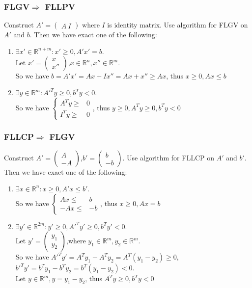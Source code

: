 	\subsubsection*{FLGV$\Rightarrow$ FLLPV}
	Construct \boldmath $A'=
	\begin{pmatrix}
	A\ I
	\end{pmatrix}$ where $I$ is identity matrix. Use algorithm for FLGV on $A'$ and $b$. Then we have exact one of the following:
	\begin{enumerate}
		\item $\exists x'\in \mathbb{R}^{n+m}:x'\geq 0,A'x'=b$.\\ Let $x'=\begin{pmatrix}
		x\\x''
		\end{pmatrix}$,$x\in \mathbb{R}^n,x''\in \mathbb{R}^m$.\\ So we have $b=A'x'=Ax+Ix''=Ax+x''\geq Ax$, thus $x\geq 0,Ax\leq b$
		\item $\exists y\in \mathbb{R}^{m}:A'^Ty\geq 0,b^Ty<0$.\\ So we have $\left\{\begin{aligned}
		A^Ty\geq& 0\\
		I^Ty\geq& 0
		\end{aligned}\right.$, thus $y\geq0,A^Ty\geq 0,b^Ty<0$
	\end{enumerate}
	\subsubsection*{FLLCP$\Rightarrow$ FLGV}
	Construct \boldmath $A'=
	\begin{pmatrix}
	A\\ -A
	\end{pmatrix}$,$b'=\begin{pmatrix}
	b\\ -b
	\end{pmatrix}$. Use algorithm for FLLCP on $A'$ and $b'$. Then we have exact one of the following:
	\begin{enumerate}
		\item $\exists x\in \mathbb{R}^n:x\geq 0,A'x\leq b'$.\\ So we have $\left\{\begin{aligned}
		Ax\leq& b\\
		-Ax\leq& -b
		\end{aligned}\right.$, thus $x\geq 0,Ax=b$
		\item $\exists y'\in \mathbb{R}^{2m}:y'\geq 0,A'^Ty'\geq 0,b^Ty'<0$.\\ Let $y'=\begin{pmatrix}
		y_1\\ y_2
		\end{pmatrix}$,where $y_1\in \mathbb{R}^m,y_2\in \mathbb{R}^m$.\\ So we have $A'^Ty'=A^Ty_1-A^Ty_2=A^T(y_1-y_2)\geq 0$, $b'^Ty'=b^Ty_1-b^Ty_2=b^T(y_1-y_2)<0$.\\ Let $y\in \mathbb{R}^m,y=y_1-y_2$, thus $A^Ty\geq 0,b^Ty<0$
	\end{enumerate}

